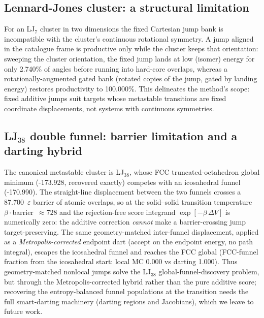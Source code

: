 \subsection{Lennard-Jones cluster: a structural limitation}For an LJ$_{7}$ cluster in two dimensions the fixed Cartesian jump bank is incompatible with the cluster's continuous rotational symmetry. A jump aligned in the catalogue frame is productive only while the cluster keeps that orientation: sweeping the cluster orientation, the fixed jump lands at low (isomer) energy for only 2.740\% of angles before running into hard-core overlaps, whereas a rotationally-augmented gated bank (rotated copies of the jump, gated by landing energy) restores productivity to 100.000\%. This delineates the method's scope: fixed additive jumps suit targets whose metastable transitions are fixed coordinate displacements, not systems with continuous symmetries.

\subsection{LJ$_{38}$ double funnel: barrier limitation and a darting hybrid}The canonical metastable cluster is LJ$_{38}$, whose FCC truncated-octahedron global minimum (-173.928, recovered exactly) competes with an icosahedral funnel (-170.990). The straight-line displacement between the two funnels crosses a 87.700~$\varepsilon$ barrier of atomic overlaps, so at the solid--solid transition temperature $\beta\cdot$barrier~$\approx728$ and the rejection-free score integrand $\exp[-\beta\,\Delta V]$ is numerically zero: the additive correction \emph{cannot} make a barrier-crossing jump target-preserving. The same geometry-matched inter-funnel displacement, applied as a \emph{Metropolis-corrected} endpoint dart (accept on the endpoint energy, no path integral), escapes the icosahedral funnel and reaches the FCC global (FCC-funnel fraction from the icosahedral start: local MC 0.000 vs darting 1.000). Thus geometry-matched nonlocal jumps solve the LJ$_{38}$ global-funnel-discovery problem, but through the Metropolis-corrected hybrid rather than the pure additive score; recovering the entropy-balanced funnel populations at the transition needs the full smart-darting machinery (darting regions and Jacobians), which we leave to future work.

